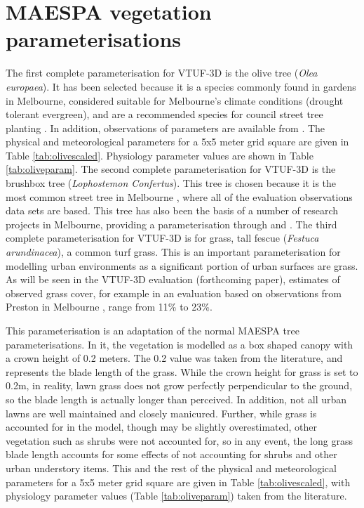 \documentclass[final,3p,times,authoryear]{elsarticle}
\begin{document}


\section{MAESPA vegetation parameterisations}\label{sec:maespavegpara}  
%

The first complete parameterisation for VTUF-3D is the olive tree (\textit{Olea europaea}). It has been selected because it is a species commonly found in gardens in Melbourne, considered suitable for Melbourne's climate conditions (drought tolerant evergreen), and are a recommended species for council street tree planting \citep{PortPhillip2010}. In addition, observations of parameters are available from \cite{Coutts2014a}. The physical and meteorological parameters for a 5x5 meter grid square are given in Table \ref{tab:olivescaled}. Physiology parameter values are shown in Table \ref{tab:oliveparam}. The second complete parameterisation for VTUF-3D is the  brushbox tree (\textit{Lophostemon Confertus}). This tree is chosen because it is the most common street tree in Melbourne \citep{Frank2006}, where all of the evaluation observations data sets are based. This tree has also been the basis of a number of research projects in Melbourne, providing a parameterisation through \cite{Coutts2016} and \cite{Coutts2015ICUC}. The third complete parameterisation for VTUF-3D is for grass, tall fescue (\textit{Festuca arundinacea}), a common turf grass. This is an important parameterisation for modelling urban environments as a significant portion of urban surfaces are grass. As will be seen in the VTUF-3D evaluation (forthcoming paper), estimates of observed grass cover, for example in an evaluation based on observations from Preston in Melbourne \citep{Coutts2007,Nury2015}, range from 11\% to 23\%. 

This parameterisation is an adaptation of the normal MAESPA tree parameterisations. In it, the vegetation is modelled as a box shaped canopy with a crown height of 0.2 meters. The 0.2 value was taken from the literature, and represents the blade length of the grass. While the crown height for grass is set to 0.2m, in reality, lawn grass does not grow perfectly perpendicular to the ground, so the blade length is actually longer than perceived. In addition, not all urban lawns are well maintained and closely manicured. Further, while grass is accounted for in the model, though may be slightly overestimated, other vegetation such as shrubs were not accounted for, so in any event, the long grass blade length accounts for some effects of not accounting for shrubs and other urban understory items. This and the rest of the physical and meteorological parameters for a 5x5 meter grid square are given in Table \ref{tab:olivescaled}, with physiology parameter values (Table \ref{tab:oliveparam}) taken from the literature.
\end{document}
